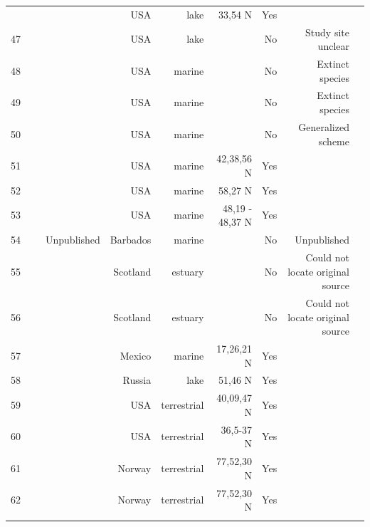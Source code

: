 \documentclass[12pt]{article}
\begin{document}
\begin{landscape}
\begin{table}[h!]
\begin{tabular}{rrrrrrrrr}
{      46    & ~\citet{GlobalWeb} & ~\citet{Patten1975} & USA   & lake & 33,54 N & Yes   &       &  \\
      47    & ~\citet{GlobalWeb} & ~\citet{Harris1980} & USA   & lake &       & No    & Study site unclear &  \\
      48    & ~\citet{GlobalWeb} & ~\citet{Simenstad1978} & USA   & marine &       & No    & Extinct species &  \\
      49    & ~\citet{GlobalWeb} & ~\citet{Simenstad1978} & USA   & marine &       & No    & Extinct species &  \\
      50    & ~\citet{GlobalWeb} & ~\citet{Nybakken1982} & USA   & marine &       & No    & Generalized scheme &  \\
      51    & ~\citet{GlobalWeb} & ~\citet{Dexter1947} & USA   & marine & 42,38,56 N & Yes   &       &  \\
      52    & ~\citet{GlobalWeb} & ~\citet{Paine1980a} & USA   & marine & 58,27 N & Yes   &       &  \\
      53    & ~\citet{GlobalWeb} & ~\citet{Paine1980a} & USA   & marine & 48,19 - 48,37 N & Yes   &       &  \\
      54    & ~\citet{GlobalWeb} & Unpublished & Barbados & marine &       & No    & Unpublished &  \\
      55    & ~\citet{GlobalWeb} & ~\citet{Milne1972} & Scotland & estuary &       & No    & Could not locate original source &  \\
      56    & ~\citet{GlobalWeb} & ~\citet{Milne1972} & Scotland & estuary &       & No    & Could not locate original source &  \\
      57    & ~\citet{GlobalWeb} & ~\citet{Yanez1978} & Mexico & marine & 17,26,21 N & Yes   &       &  \\
      58    & ~\citet{GlobalWeb} & ~\citet{Cohen1990} & Russia & lake & 51,46 N & Yes   &       &  \\
      59    & ~\citet{GlobalWeb} & ~\citet{Twomey1945} & USA   & terrestrial & 40,09,47 N & Yes   &       &  \\
      60    & ~\citet{GlobalWeb} & ~\citet{Rasmussen1941} & USA   & terrestrial & 36,5-37 N & Yes   &       &  \\
      61    & ~\citet{GlobalWeb} & ~\citet{Summerhayes1928} & Norway & terrestrial & 77,52,30 N & Yes   &       &  \\
      62    & ~\citet{GlobalWeb} & ~\citet{Summerhayes1928} & Norway & terrestrial & 77,52,30 N & Yes   &       &  \\
}
\end{tabular}
\end{table}
\end{landscape}
\end{document}
